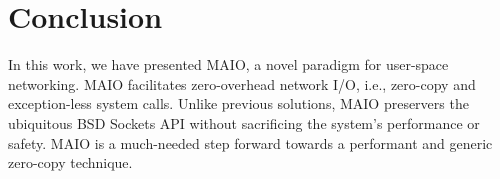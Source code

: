 \documentclass[sigconf,9pt]{acmart}
\newcommand{\oursys}{MAIO\xspace}
\newcommand{\sockets}{BSD Sockets\xspace}
\begin{document}

\section{Conclusion}
In this work, we have presented \oursys, a novel paradigm for user-space networking. \oursys facilitates zero-overhead network I/O, i.e., zero-copy and exception-less system calls. Unlike previous solutions, \oursys preservers the ubiquitous \sockets API without sacrificing the system's performance or safety.
\oursys is a much-needed step forward towards a performant and generic zero-copy technique. %



\end{document}
